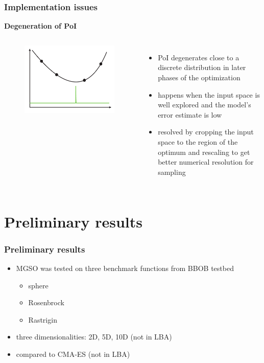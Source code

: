 \documentclass[sans,mathserif]{beamer}
\newcommand{\blue}[1]{{\color{blue} #1}}
\begin{document}
\begin{frame}
  \frametitle{Implementation issues}
  \textbf{Degeneration of PoI}
  \begin{columns}[T]
  \column{5cm}
    \begin{figure}
    \includegraphics[width=\linewidth]{img/degenerate-poi}
    \end{figure}
  \column{5.5cm}
    \begin{itemize}
      \item PoI degenerates close to a discrete distribution in later phases of the optimization
      \item happens when the input space is well explored and the model's error estimate is low
      \item resolved by \alert{cropping} the input space to the region of the optimum and \alert{rescaling} to get
        better numerical resolution for sampling
    \end{itemize}
  \end{columns}
\end{frame}

\section{Preliminary results}

\begin{frame}
  \frametitle{Preliminary results}
  \begin{itemize}
    \item MGSO was tested on \blue{three benchmark} functions from BBOB testbed
      \begin{itemize}
        \item sphere
        \item Rosenbrock
        \item Rastrigin
      \end{itemize}
    \item three dimensionalities: 2D, 5D, 10D (not in LBA)
    \item compared to \blue{CMA-ES} (not in LBA)
  \end{itemize}
\end{frame}
\end{document}
